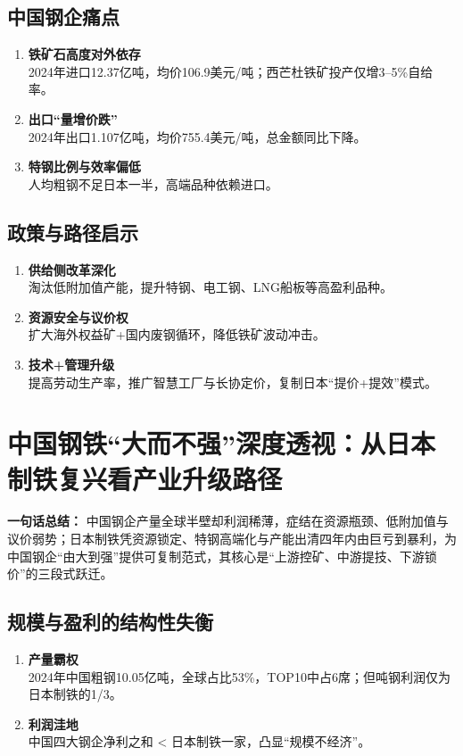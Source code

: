 \subsection{中国钢企痛点}
\begin{enumerate}[leftmargin=*, nosep]
    \item \textbf{铁矿石高度对外依存}  \\
    2024年进口12.37亿吨，均价106.9美元/吨；西芒杜铁矿投产仅增3–5\%自给率。
    \item \textbf{出口“量增价跌”}  \\
    2024年出口1.107亿吨，均价755.4美元/吨，总金额同比下降。
    \item \textbf{特钢比例与效率偏低}  \\
    人均粗钢不足日本一半，高端品种依赖进口。
\end{enumerate}

\subsection{政策与路径启示}
\begin{enumerate}[leftmargin=*, nosep]
    \item \textbf{供给侧改革深化}  \\
    淘汰低附加值产能，提升特钢、电工钢、LNG船板等高盈利品种。
    \item \textbf{资源安全与议价权}  \\
    扩大海外权益矿+国内废钢循环，降低铁矿波动冲击。
    \item \textbf{技术+管理升级}  \\
    提高劳动生产率，推广智慧工厂与长协定价，复制日本“提价+提效”模式。
\end{enumerate}


\section{中国钢铁“大而不强”深度透视：从日本制铁复兴看产业升级路径}
\textbf{一句话总结：}  
中国钢企产量全球半壁却利润稀薄，症结在资源瓶颈、低附加值与议价弱势；日本制铁凭资源锁定、特钢高端化与产能出清四年内由巨亏到暴利，为中国钢企“由大到强”提供可复制范式，其核心是“上游控矿、中游提技、下游锁价”的三段式跃迁。

\subsection{规模与盈利的结构性失衡}
\begin{enumerate}[leftmargin=*, nosep]
    \item \textbf{产量霸权}  \\
    2024年中国粗钢10.05亿吨，全球占比53\%，TOP10中占6席；但吨钢利润仅为日本制铁的1/3。
    \item \textbf{利润洼地}  \\
    中国四大钢企净利之和 < 日本制铁一家，凸显“规模不经济”。
\end{enumerate}

